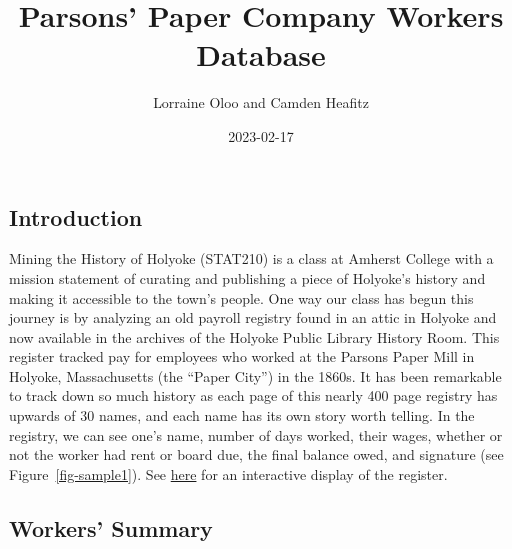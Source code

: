 \documentclass[
  letterpaper,
  DIV=11,
  numbers=noendperiod]{scrartcl}
\title{Parsons' Paper Company Workers Database}
\author{Lorraine Oloo and Camden Heafitz}
\date{2023-02-17}
\begin{document}
\maketitle
\ifdefined\Shaded\renewenvironment{Shaded}{\begin{tcolorbox}[boxrule=0pt, interior hidden, enhanced, sharp corners, frame hidden, borderline west={3pt}{0pt}{shadecolor}, breakable]}{\end{tcolorbox}}\fi

\hypertarget{introduction}{%
\subsection{Introduction}\label{introduction}}

Mining the History of Holyoke (STAT210) is a class at Amherst College
with a mission statement of curating and publishing a piece of Holyoke's
history and making it accessible to the town's people. One way our class
has begun this journey is by analyzing an old payroll registry found in
an attic in Holyoke and now available in the archives of the Holyoke
Public Library History Room. This register tracked pay for employees who
worked at the Parsons Paper Mill in Holyoke, Massachusetts (the ``Paper
City'') in the 1860s. It has been remarkable to track down so much
history as each page of this nearly 400 page registry has upwards of 30
names, and each name has its own story worth telling. In the registry,
we can see one's name, number of days worked, their wages, whether or
not the worker had rent or board due, the final balance owed, and
signature (see Figure~\ref{fig-sample1}). See
\href{https://r.amherst.edu/apps/nhorton/Parsons-Paper/}{here} for an
interactive display of the register.

\hypertarget{workers-summary}{%
\subsection{Workers' Summary}\label{workers-summary}}
\end{document}

